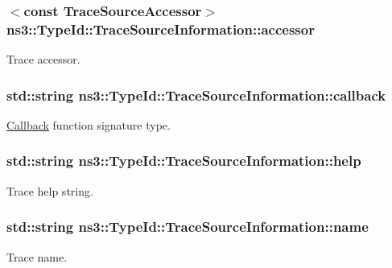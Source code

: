 \subsubsection[{\texorpdfstring{accessor}{accessor}}]{$<$const {\bf Trace\+Source\+Accessor}$>$ ns3\+::\+Type\+Id\+::\+Trace\+Source\+Information\+::accessor}\hypertarget{structns3_1_1TypeId_1_1TraceSourceInformation_aa9ad61222c0614fa5b146f132c2f2ad3}{}\label{structns3_1_1TypeId_1_1TraceSourceInformation_aa9ad61222c0614fa5b146f132c2f2ad3}
Trace accessor. 
\subsubsection[{\texorpdfstring{callback}{callback}}]{\setlength{\rightskip}{0pt plus 5cm}std\+::string ns3\+::\+Type\+Id\+::\+Trace\+Source\+Information\+::callback}\hypertarget{structns3_1_1TypeId_1_1TraceSourceInformation_ab88a91bae633604934a607053b1692ef}{}\label{structns3_1_1TypeId_1_1TraceSourceInformation_ab88a91bae633604934a607053b1692ef}
\hyperlink{classns3_1_1Callback}{Callback} function signature type. 
\subsubsection[{\texorpdfstring{help}{help}}]{\setlength{\rightskip}{0pt plus 5cm}std\+::string ns3\+::\+Type\+Id\+::\+Trace\+Source\+Information\+::help}\hypertarget{structns3_1_1TypeId_1_1TraceSourceInformation_a6c633e149439dfc7e325e9f24a9966f0}{}\label{structns3_1_1TypeId_1_1TraceSourceInformation_a6c633e149439dfc7e325e9f24a9966f0}
Trace help string. 
\subsubsection[{\texorpdfstring{name}{name}}]{\setlength{\rightskip}{0pt plus 5cm}std\+::string ns3\+::\+Type\+Id\+::\+Trace\+Source\+Information\+::name}\hypertarget{structns3_1_1TypeId_1_1TraceSourceInformation_a269c71739630feb8d42333eedff58fb0}{}\label{structns3_1_1TypeId_1_1TraceSourceInformation_a269c71739630feb8d42333eedff58fb0}
Trace name. 
